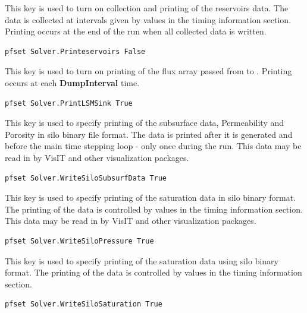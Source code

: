 {
This key is used to turn on collection and printing of the
reservoirs data.  The data is collected at intervals given by values
in the timing information section.  Printing occurs at the
end of the run when all collected data is written.
}
\begin{display}\begin{verbatim}
pfset Solver.Printeservoirs False
\end{verbatim}\end{display}

{
This key is used to turn on printing of the
flux array passed from  to \parflow{}.   Printing occurs at each {\bf DumpInterval} time.
}
\begin{display}\begin{verbatim}
pfset Solver.PrintLSMSink True
\end{verbatim}\end{display}

{
This key is used to specify printing of the subsurface data,
Permeability and Porosity in silo binary file format.  The data is printed after it is
generated and before the main time stepping loop - only once
during the run.  This data may be read in by VisIT and other visualization packages.
}
\begin{display}\begin{verbatim}
pfset Solver.WriteSiloSubsurfData True
\end{verbatim}\end{display}

{
This key is used to specify printing of the saturation data in silo binary format.
The printing of the data is controlled by values in the
timing information section. This data may be read in by VisIT and other visualization packages.
}
\begin{display}\begin{verbatim}
pfset Solver.WriteSiloPressure True
\end{verbatim}\end{display}

{
This key is used to specify printing of the saturation data using silo binary format.
The printing of the data is controlled by values in the
timing information section.
}
\begin{display}\begin{verbatim}
pfset Solver.WriteSiloSaturation True
\end{verbatim}\end{display}

